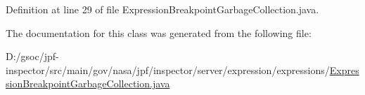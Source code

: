 Definition at line 29 of file Expression\+Breakpoint\+Garbage\+Collection.\+java.



The documentation for this class was generated from the following file\+:\begin{DoxyCompactItemize}
\item 
D\+:/gsoc/jpf-\/inspector/src/main/gov/nasa/jpf/inspector/server/expression/expressions/\hyperlink{_expression_breakpoint_garbage_collection_8java}{Expression\+Breakpoint\+Garbage\+Collection.\+java}\end{DoxyCompactItemize}
